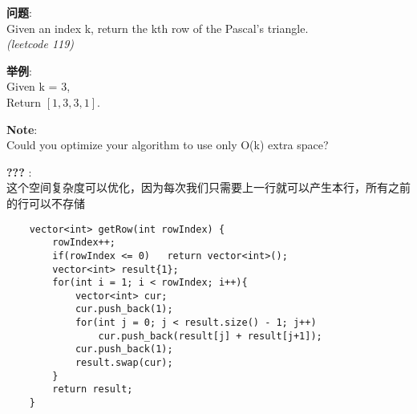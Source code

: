     
\begin{description}
    \item{\textbf{问题}}:\\
Given an index k, return the kth row of the Pascal's triangle. \\
\textit{(leetcode 119)}
    \item{\textbf{举例}}:\\
Given k = 3, \\
Return $[1,3,3,1]$.
    \item{\textbf{Note}}:\\
Could you optimize your algorithm to use only O(k) extra space?
    \item{\textbf{???}} : 
    \\这个空间复杂度可以优化，因为每次我们只需要上一行就可以产生本行，所有之前的行可以不存储
    \begin{lstlisting}
	vector<int> getRow(int rowIndex) {
		rowIndex++;
		if(rowIndex <= 0)	return vector<int>();
		vector<int> result{1};
		for(int i = 1; i < rowIndex; i++){
			vector<int> cur;
			cur.push_back(1);
			for(int j = 0; j < result.size() - 1; j++)
				cur.push_back(result[j] + result[j+1]);
			cur.push_back(1);
			result.swap(cur);
		}
		return result;
	}
    \end{lstlisting}
\end{description}
